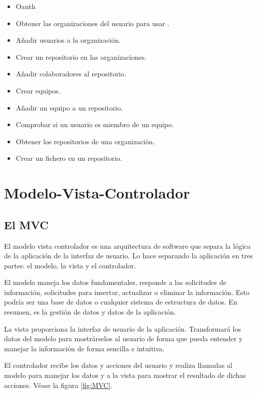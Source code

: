 \begin{itemize}
  \item Oauth
  \item Obtener las organizaciones del usuario para usar .
  \item Añadir usuarios a la organización.
  \item Crear un repositorio en las organizaciones.
  \item Añadir colaboradores al repositorio.
  \item Crear equipos.
  \item Añadir un equipo a un repositorio.
  \item Comprobar si un usuario es miembro de un equipo.
  \item Obtener los repositorios de una organización.
  \item Crear un fichero en un repositorio.
\end{itemize}

\section{Modelo-Vista-Controlador}
\label{:sec3}

\subsection{El MVC}
\label{3:3:1}

El modelo vista controlador es una arquitectura de software que separa la lógica de la aplicación de la interfaz de usuario. Lo hace separando la aplicación en tres partes: el modelo, la vista y el controlador.

El modelo maneja los datos fundamentales, responde a las solicitudes de información, solicitudes para insertar, actualizar o eliminar la información. Esto podría ser una base de datos o cualquier sistema de estructura de datos. En resumen, es la gestión de datos y datos de la aplicación.

La vista proporciona la interfaz de usuario de la aplicación. Transformará los datos del modelo para mostrárselos al usuario de forma que pueda entender y manejar la información de forma sencilla e intuitiva.

El controlador recibe los datos y acciones del usuario y realiza llamadas al modelo para manejar los datos y a la vista para mostrar el resultado de dichas acciones. Véase la figura \ref{fig:MVC}.

